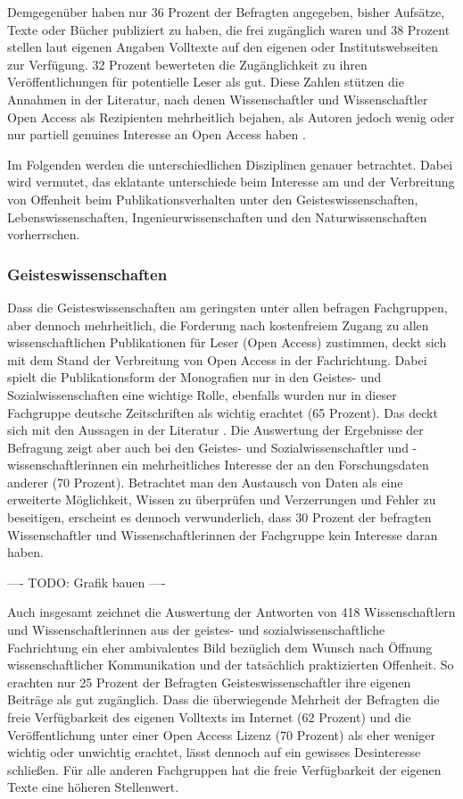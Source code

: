 Demgegenüber haben nur 36 Prozent der Befragten angegeben, bisher Aufsätze, Texte oder Bücher publiziert zu haben, die frei zugänglich waren und 38 Prozent stellen laut eigenen Angaben Volltexte auf den eigenen oder Institutswebseiten zur Verfügung. 32 Prozent bewerteten die Zugänglichkeit zu ihren Veröffentlichungen für potentielle Leser als gut. Diese Zahlen stützen die Annahmen in der Literatur, nach denen Wissenschaftler und Wissenschaftler  Open Access als Rezipienten mehrheitlich bejahen, als Autoren jedoch wenig oder nur partiell genuines Interesse an Open Access haben \cite{wein_2010_erwerbung}.

Im Folgenden werden die unterschiedlichen Disziplinen genauer betrachtet. Dabei wird vermutet, das eklatante unterschiede beim Interesse am und der Verbreitung von Offenheit beim Publikationsverhalten unter den Geisteswissenschaften, Lebenswissenschaften, Ingenieurwissenschaften und den Naturwissenschaften vorherrschen.

\subsubsection{Geisteswissenschaften}

Dass die Geisteswissenschaften am geringsten unter allen befragen Fachgruppen, aber dennoch mehrheitlich, die Forderung nach kostenfreiem Zugang zu allen wissenschaftlichen Publikationen für Leser (Open Access) zustimmen, deckt sich mit dem Stand der Verbreitung von Open Access in der Fachrichtung. Dabei spielt die Publikationsform der Monografien nur in den Geistes- und Sozialwissenschaften eine wichtige Rolle, ebenfalls wurden nur in dieser Fachgruppe deutsche Zeitschriften als wichtig erachtet  (65 Prozent). Das deckt sich mit den Aussagen in der Literatur \cite{hagner_2015_sache_buches} \cite{naeder_2010_open} \cite{hollricher_wandel_2009} \cite{Lossau_oa_2007}. Die Auswertung der Ergebnisse der Befragung zeigt aber auch bei den Geistes- und Sozialwissenschaftler und -wissenschaftlerinnen ein mehrheitliches Interesse der an den Forschungsdaten anderer (70 Prozent). Betrachtet man den Austausch von Daten als eine erweiterte Möglichkeit, Wissen zu überprüfen und Verzerrungen und Fehler zu beseitigen, erscheint es dennoch verwunderlich, dass 30 Prozent der befragten Wissenschaftler und Wissenschaftlerinnen der Fachgruppe kein Interesse daran haben.

---- TODO: Grafik bauen ----

Auch insgesamt zeichnet die Auswertung der Antworten von 418 Wissenschaftlern und Wissenschaftlerinnen aus der geistes- und sozialwissenschaftliche Fachrichtung ein eher ambivalentes Bild bezüglich dem Wunsch nach Öffnung wissenschaftlicher Kommunikation und der tatsächlich praktizierten Offenheit. So erachten nur 25 Prozent der Befragten Geisteswissenschaftler ihre eigenen Beiträge als gut zugänglich. Dass die überwiegende Mehrheit der Befragten die freie Verfügbarkeit des eigenen Volltexts im Internet (62 Prozent) und die Veröffentlichung unter einer Open Access Lizenz (70 Prozent) als eher weniger wichtig oder unwichtig erachtet, lässt dennoch auf ein gewisses Desinteresse schließen. Für alle anderen Fachgruppen hat die freie Verfügbarkeit der eigenen Texte eine höheren Stellenwert.

